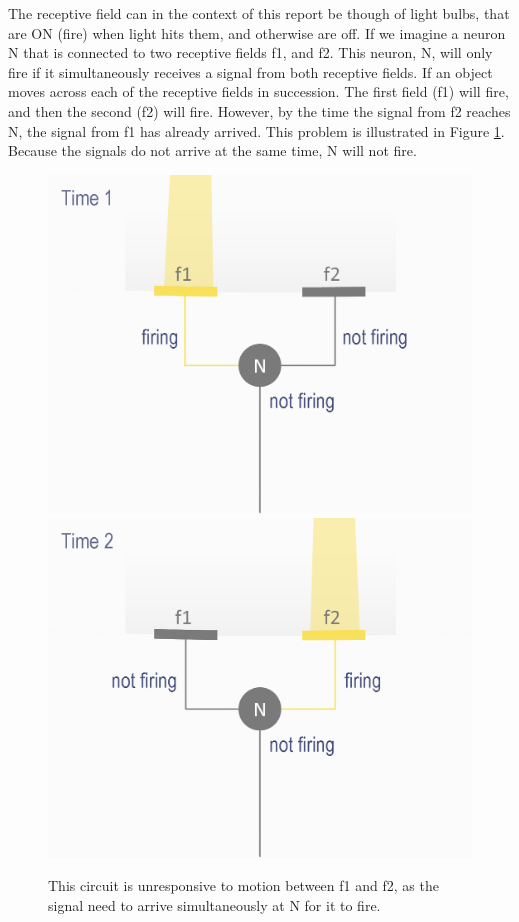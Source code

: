 \documentclass[11pt,a4paper,oneside,table,xcdraw]{article}
\begin{document}
The receptive field can in the context of this report be though of light bulbs, that are ON (fire) when light hits them, and otherwise are off. If we imagine a neuron N that is connected to two receptive fields f1, and f2. This neuron, N, will only fire if it simultaneously receives a signal from both receptive fields. If an object moves across each of the receptive fields in succession. The first field (f1) will fire, and then the second (f2) will fire. However, by the time the signal from f2 reaches N, the signal from f1 has already arrived. This problem is illustrated in Figure \ref{fig:nodelay}. Because the signals do not arrive at the same time, N will not fire.
\begin{figure}[H]
\begin{multicols}{2}
\includegraphics[width=1\linewidth]{figure/model1.png}
\columnbreak
\includegraphics[width=1\linewidth]{figure/model2.png}
\end{multicols}
\caption{This circuit is unresponsive to motion between f1 and f2, as the signal need to arrive simultaneously at N for it to fire.}
\label{fig:nodelay}
\end{figure}
\end{document}
